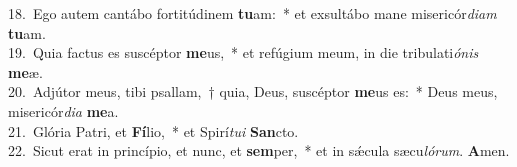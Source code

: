 {18.~}Ego autem cantábo fortitúdinem \textbf{tu}am:~* et exsultábo mane misericór\textit{di}\textit{am} \textbf{tu}am.\\
{19.~}Quia factus es suscéptor \textbf{me}us,~* et refúgium meum, in die tribulati\textit{ó}\textit{nis} \textbf{me}æ.\\
{20.~}Adjútor meus, tibi psallam,~† quia, Deus, suscéptor \textbf{me}us es:~* Deus meus, misericór\textit{di}\textit{a} \textbf{me}a.\\
{21.~}Glória Patri, et \textbf{Fí}lio,~* et Spirí\textit{tu}\textit{i} \textbf{San}cto.\\
{22.~}Sicut erat in princípio, et nunc, et \textbf{sem}per,~* et in sǽcula sæcu\textit{ló}\textit{rum}. \textbf{A}men.\\
